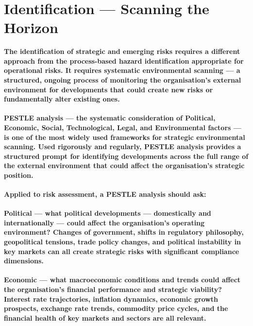 \section{Identification — Scanning the Horizon}
\paragraph{The identification of strategic and emerging risks requires a different approach from the process-based hazard identification appropriate for operational risks. It requires \textbf{systematic environmental scanning} — a structured, ongoing process of monitoring the organisation's external environment for developments that could create new risks or fundamentally alter existing ones.}
\paragraph{\textbf{PESTLE analysis} — the systematic consideration of Political, Economic, Social, Technological, Legal, and Environmental factors — is one of the most widely used frameworks for strategic environmental scanning. Used rigorously and regularly, PESTLE analysis provides a structured prompt for identifying developments across the full range of the external environment that could affect the organisation's strategic position.}
\paragraph{Applied to risk assessment, a PESTLE analysis should ask:}
\paragraph{\textbf{Political} — what political developments — domestically and internationally — could affect the organisation's operating environment? Changes of government, shifts in regulatory philosophy, geopolitical tensions, trade policy changes, and political instability in key markets can all create strategic risks with significant compliance dimensions.}
\paragraph{\textbf{Economic} — what macroeconomic conditions and trends could affect the organisation's financial performance and strategic viability? Interest rate trajectories, inflation dynamics, economic growth prospects, exchange rate trends, commodity price cycles, and the financial health of key markets and sectors are all relevant.}
